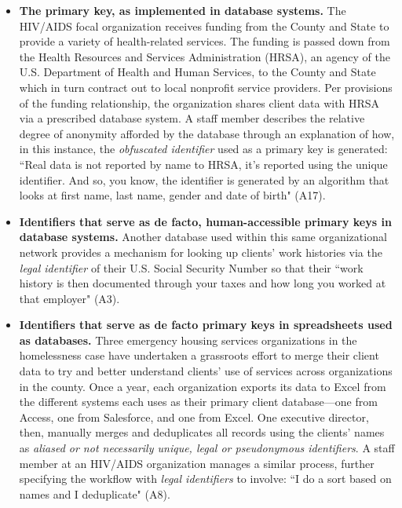 \begin{itemize}
\item \textbf{The primary key, as implemented in database systems.} The HIV/AIDS focal organization receives funding from the County and State to provide a variety of health-related services. The funding is passed down from the Health Resources and Services Administration (HRSA), an agency of the U.S. Department of Health and Human Services, to the County and State which in turn contract out to local nonprofit service providers. Per provisions of the funding relationship, the organization shares client data with HRSA via a prescribed database system. A staff member describes the relative degree of anonymity afforded by the database through an explanation of how, in this instance, the \textit{obfuscated identifier} used as a primary key is generated: ``Real data is not reported by name to HRSA, it's reported using the unique identifier. And so, you know, the identifier is generated by an algorithm that looks at first name, last name, gender and date of birth" (A17). 
\item \textbf{Identifiers that serve as de facto, human-accessible primary keys in database systems.} Another database used within this same organizational network provides a mechanism for looking up clients' work histories via the \textit{legal identifier} of their U.S. Social Security Number so that their ``work history is then documented through your taxes and how long you worked at that employer" (A3).
\item \textbf{Identifiers that serve as de facto primary keys in spreadsheets used as databases.} Three emergency housing services organizations in the homelessness case have undertaken a grassroots effort to merge their client data to try and better understand clients' use of services across organizations in the county. Once a year, each organization exports its data to Excel from the different systems each uses as their primary client database---one from Access, one from Salesforce, and one from Excel. One executive director, then, manually merges and deduplicates all records using the clients' names as \textit{aliased or not necessarily unique, legal or pseudonymous identifiers}. A staff member at an HIV/AIDS organization manages a similar process, further specifying the workflow with \textit{legal identifiers} to involve: ``I do a sort based on names and I deduplicate" (A8).

\end{itemize}
